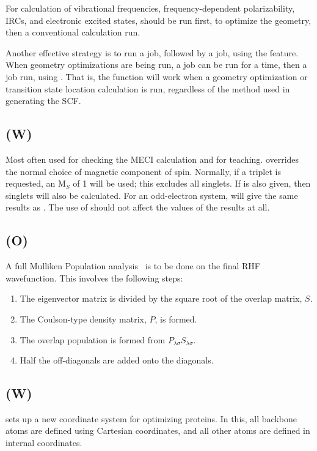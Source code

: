 For calculation of vibrational frequencies, frequency-dependent
polarizability, IRCs, and electronic excited states,  should
be run first, to optimize the geometry, then a conventional 
calculation run.

Another effective strategy is to run a  job, followed by
a  job, using the  feature.  When geometry
optimizations are being run, a  job can be run for a time,
then a  job run, using .  That is, the
 function will work when a geometry optimization or
transition state location calculation is run, regardless of the
method used in generating the SCF.



\subsection*{ (W)}
        Most often used for checking the MECI calculation  and  for  teaching.
   overrides  the normal choice of magnetic component of spin.  Normally, if
   a triplet is requested, an  M$_S$ of  1  will  be  used;  this  excludes  all
   singlets.   If  is also given, then singlets will also be calculated.
For an odd-electron system,  will give the same results as
.  The use of  should not affect the values of the results at
all.


\subsection*{ (O)}
        A full Mulliken Population analysis~\cite{mullik1,mullik2} is to
   be done on the  final  RHF
   wavefunction.  This involves the following steps:
\begin{enumerate}
 \item The eigenvector matrix is divided by the square root
           of the overlap matrix, $S$.
 \item The Coulson-type density matrix, $P$, is formed.
 \item The overlap population is formed from $P_{ \lambda\sigma} S_{\lambda\sigma}$.
 \item Half the off-diagonals are added onto the diagonals.
\end{enumerate}

\subsection*{ (W)}
 sets up a new coordinate system for optimizing proteins.
In this, all backbone atoms are defined using Cartesian coordinates, and
all other atoms are defined in internal coordinates.

